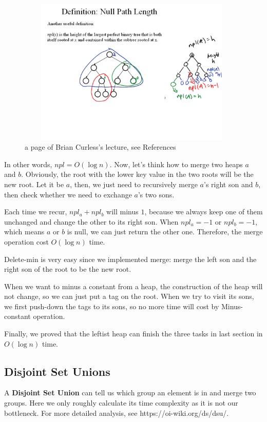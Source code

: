 \documentclass{article}
\begin{document}
\begin{figure}
    \centering
    \includegraphics[height=7cm,width=11cm]{figure/figure3.png}
    \caption{a page of Brian Curless's lecture, see References}
    \label{3}
\end{figure}

In other words, $npl=O(\log n)$. Now, let's think how to merge two heaps $a$ and $b$. Obviously, the root with the lower key value in the two roots will be the new root. Let it be $a$, then, we just need to recursively merge $a$'s right son and $b$, then check whether we need to exchange $a$'s two sons.

Each time we recur, $npl_a+npl_b$ will minus $1$, because we always keep one of them unchanged and change the other to its right son. When $npl_a=-1$ or $npl_b=-1$, which means $a$ or $b$ is null, we can just return the other one. Therefore, the merge operation cost $O(\log n)$ time.

Delete-min is very easy since we implemented merge: merge the left son and the right son of the root to be the new root.

When we want to minus a constant from a heap, the construction of the heap will not change, so we can just put a tag on the root. When we try to visit its sons, we first push-down the tags to its sons, so no more time will cost by Minus-constant operation.

Finally, we proved that the leftist heap can finish the three tasks in last section in $O(\log n)$ time.

\subsection{Disjoint Set Unions}

A \textbf{Disjoint Set Union} can tell us which group an element is in and merge two groups. Here we only roughly calculate its time complexity as it is not our bottleneck. For more detailed analysis, see https://oi-wiki.org/ds/dsu/.
\end{document}
